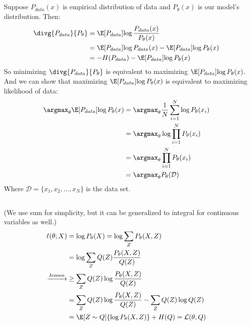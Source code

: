 \documentclass{article}
\begin{document}
\subsection{}
Suppose \(P_{data}(x)\) is empirical distribution of data and \(P_\theta(x)\) is our model's distribution. Then:
\begin{align*}
\divg{P_{data}}{P_\theta} &= \E[P_{data}]{\log \frac{P_{data}(x)}{P_\theta(x)}}\\
&= \E[P_{data}]{\log P_{data}(x)} - \E[P_{data}]{\log P_\theta(x)}\\
&= -H(P_{data}) - \E[P_{data}]{\log P_\theta(x)}
\end{align*}
So minimizing \(\divg{P_{data}}{P_\theta}\) is equivalent to maximizing \(\E[P_{data}]{\log P_\theta(x)}\).
And we can show that maximizing \(\E[P_{data}]{\log P_\theta(x)}\) is equivalent to maximizing likelihood of data:
\begin{align*}
\argmax_\theta \E[P_{data}]{\log P_\theta(x)} &= \argmax_\theta \frac{1}{N} \sum_{i=1}^N \log P_\theta(x_i)\\
&= \argmax_\theta \log \prod_{i=1}^N P_\theta(x_i)\\
&= \argmax_\theta \prod_{i=1}^N P_\theta(x_i)\\
&= \argmax_\theta P_\theta(\mathcal{D})
\end{align*}
Where \(\mathcal{D} = \{x_1, x_2, \dots, x_N\}\) is the data set.

\subsection{}
(We use sum for simplicity, but it can be generalized to integral for continuous variables as well.)
\begin{align*}
\ell(\theta; X) &= \log P_\theta(X) = \log \sum_{Z} P_\theta(X, Z)\\
&= \log \sum_{Z} Q(Z) \frac{P_\theta(X, Z)}{Q(Z)}\\
\xrightarrow{\text{Jensen}} &\ge \sum_{Z} Q(Z) \log \frac{P_\theta(X, Z)}{Q(Z)}\\
&= \sum_{Z} Q(Z) \log \frac{P_\theta(X, Z)}{Q(Z)} - \sum_{Z} Q(Z) \log Q(Z)\\
&= \E[Z\sim Q]{\log P_\theta(X, Z)} + H(Q) = \mathcal{L}(\theta, Q)
\end{align*}
\end{document}
